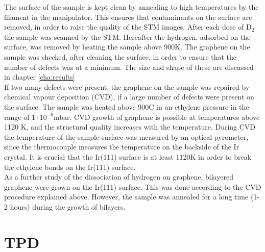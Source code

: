 The surface of the sample is kept clean by annealing to high temperatures by the filament in the manipulator. This ensures that contaminants on the surface are removed, in order to raise the quality of the STM images. After each dose of D$_2$ the sample was scanned by the STM. Hereafter the hydrogen, adsorbed on the surface, was removed by heating the sample above 900K. The graphene on the sample was checked, after cleaning the surface, in order to ensure that the number of defects was at a minimum. The size and shape of these are discussed in chapter \ref{cha:results}\\
If two many defects were present, the graphene on the sample was repaired by chemical vapour deposition (CVD), if a large number of defects were present on the surface. The sample was heated above 900\degree C in an ethylene pressure in the range of $1\cdot 10^{-6}$mbar. CVD growth of graphene is possible at temperatures above 1120 K, and the structural quality increases with the temperature.\cite{1367-2630-11-2-023006} During CVD the temperature of the sample surface was measured by an optical pyrometer, since the thermocouple measures the temperature on the backside of the Ir crystal. It is crucial that the Ir(111) surface is at least 1120K in order to break the ethylene bonds on the Ir(111) surface.\\
As a further study of the dissociation of hydrogen on graphene, bilayered graphene were grown on the Ir(111) surface. This was done according to the CVD procedure explained above. However, the sample was annealed for a long time (1-2 hours) during the growth of bilayers.

\section{TPD}

